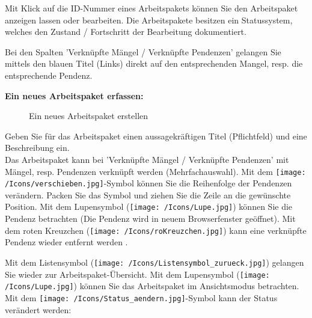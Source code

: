 \vspace{\baselineskip}

Mit Klick auf die ID-Nummer eines Arbeitspakets können Sie den Arbeitspaket anzeigen lassen oder bearbeiten. Die Arbeitspakete besitzen ein Statussystem, welches den Zustand / Fortschritt der Bearbeitung dokumentiert.

\vspace{\baselineskip}

Bei den Spalten 'Verknüpfte Mängel / Verknüpfte Pendenzen' gelangen Sie mittels den blauen Titel (Links) direkt auf den entsprechenden Mangel, resp. die entsprechende Pendenz.

\pagebreak
\textbf{Ein neues Arbeitspaket erfassen:}

\begin{figure}[H]
\caption{Ein neues Arbeitspaket erstellen}
\end{figure}

Geben Sie für das Arbeitspaket einen aussagekräftigen Titel (Pflichtfeld) und eine Beschreibung ein.\\
Das Arbeitspaket kann bei 'Verknüpfte Mängel / Verknüpfte Pendenzen' mit Mängel, resp. Pendenzen verknüpft werden (Mehrfachauswahl). Mit dem \texttt{[image: /Icons/verschieben.jpg]}-Symbol  können Sie die Reihenfolge der Pendenzen verändern. Packen Sie das Symbol und ziehen Sie die Zeile an die gewünschte Position. Mit dem Lupensymbol (\texttt{[image: /Icons/Lupe.jpg]})  können Sie die Pendenz betrachten (Die Pendenz wird in neuem Browserfenster geöffnet). Mit dem roten Kreuzchen (\texttt{[image: /Icons/roKreuzchen.jpg]}) kann eine verknüpfte Pendenz wieder entfernt werden .

\vspace{\baselineskip}

Mit dem Listensymbol (\texttt{[image: /Icons/Listensymbol\_zurueck.jpg]})  gelangen Sie wieder zur Arbeitspaket-Übersicht. Mit dem Lupensymbol (\texttt{[image: /Icons/Lupe.jpg]})  können Sie das Arbeitspaket im Ansichtsmodus betrachten. Mit dem \texttt{[image: /Icons/Status\_aendern.jpg]}-Symbol  kann der Status verändert werden:

